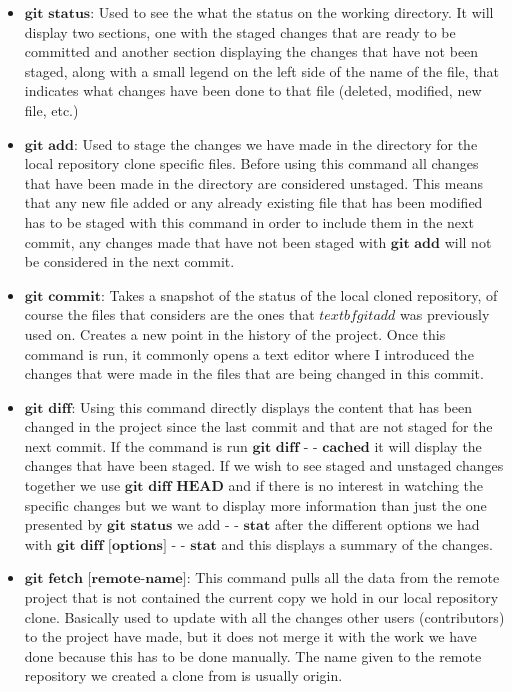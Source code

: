 \documentclass{article}
\begin{document}
\begin{itemize}
	\item $\textbf{git status:}$ Used to see the what the status on the working directory. It will display two sections, one with the staged changes that are ready to be committed and another section displaying the changes that have not been staged, along with a small legend on the left side of the name of the file, that indicates what changes have been done to that file (deleted, modified, new file, etc.)
	\item $\textbf{git add:}$ Used to stage the changes we have made in the directory for the local repository clone specific files. Before using this command all changes that have been made in the directory are considered unstaged. This means that any new file added or any already existing file that has been modified has to be staged with this command in order to include them in the next commit, any changes made that have not been staged with $\textbf{git add}$ will not be considered in the next commit.
	\item $\textbf{git commit:}$ Takes a snapshot of the status of the local cloned repository, of course the files that considers are the ones that $textbf{git add}$ was previously used on. Creates a new point in the history of the project. Once this command is run, it commonly opens a text editor where I introduced the changes that were made in the files that are being changed in this commit.
	\item $\textbf{git diff:}$ Using this command directly displays the content that has been changed in the project since the last   commit and that are not staged for the next commit. If the command is run $\textbf{git diff - - cached}$ it will display the changes that have been staged. If we wish to see staged and unstaged changes together we use $\textbf{git diff HEAD}$ and if there is no interest in watching the specific changes but we want to display more information than just the one presented by $\textbf{git status}$ we add $\textbf{- - stat}$ after the different options we had with $\textbf{git diff [options] - - stat}$ and this displays a summary of the changes.
	\item $\textbf{git fetch [remote-name]:}$ This command pulls all the data from the remote project that is not contained the current copy we hold in our local repository clone. Basically used to update with all the changes other users (contributors) to the project have made, but it does not merge it with the work we have done because this has to be done manually. The name given to the remote repository we created a clone from is usually origin.

\end{itemize}
\end{document}
